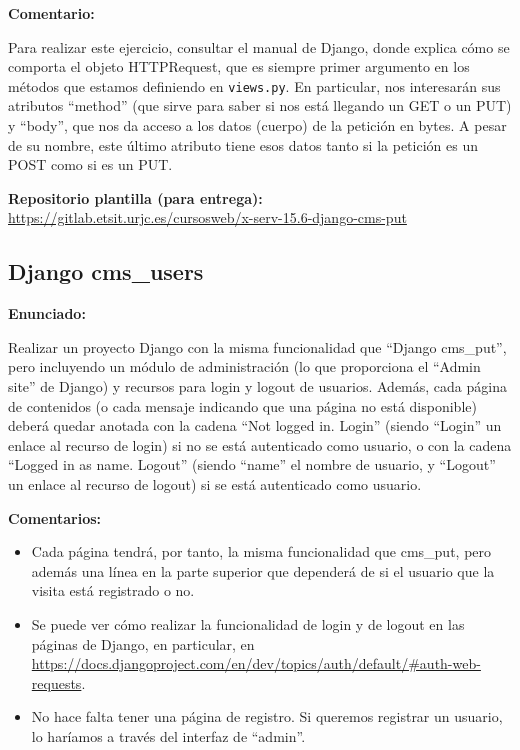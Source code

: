 \textbf{Comentario:}

Para realizar este ejercicio, consultar el manual de Django, donde explica cómo se comporta el objeto HTTPRequest, que es siempre primer argumento en los métodos que estamos definiendo en \texttt{views.py}. En particular, nos interesarán sus atributos ``method'' (que sirve para saber si nos está llegando un GET o un PUT) y ``body'', que nos da acceso a los datos (cuerpo) de la petición en bytes. A pesar de su nombre, este último atributo tiene esos datos tanto si la petición es un POST como si es un PUT. 

\textbf{Repositorio plantilla (para entrega):} \\
\url{https://gitlab.etsit.urjc.es/cursosweb/x-serv-15.6-django-cms-put}

%

\subsection{Django cms\_users}
\label{subsec:django-users}

\textbf{Enunciado:}

Realizar un proyecto Django con la misma funcionalidad que ``Django cms\_put'', pero incluyendo un módulo de administración (lo que proporciona el ``Admin site'' de Django) y recursos para login y logout de usuarios. Además, cada página de contenidos (o cada mensaje indicando que una página no está disponible) deberá quedar anotada con la cadena ``Not logged in. Login'' (siendo ``Login'' un enlace al recurso de login) si no se está autenticado como usuario, o con la cadena ``Logged in as name. Logout'' (siendo ``name'' el nombre de usuario, y ``Logout'' un enlace al recurso de logout) si se está autenticado como usuario.

\textbf{Comentarios:}

\begin{itemize}
  \item Cada página tendrá, por tanto, la misma funcionalidad que cms\_put, pero además una línea en la parte superior que dependerá de si el usuario que la visita está registrado o no.

  \item Se puede ver cómo realizar la funcionalidad de login y de logout en las páginas de Django, en particular, en \url{https://docs.djangoproject.com/en/dev/topics/auth/default/#auth-web-requests}.

  \item No hace falta tener una página de registro. Si queremos registrar un usuario, lo haríamos a través del interfaz de ``admin''.
\end{itemize}

